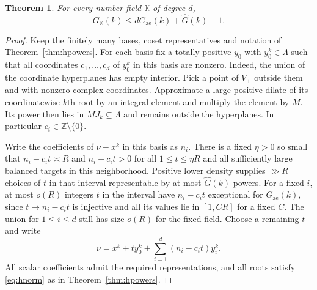 \documentclass[11pt,letterpaper]{article}
\newtheorem{theorem}{Theorem}[section]
\theoremstyle{definition}
\numberwithin{equation}{section}
\begin{document}
\begin{theorem}\label{thm:haetransfer}
For every number field $\mathbb K$ of degree $d$,
\[
               G_{\mathbb K}(k)
                   \le dG_{\mathrm{ae}}(k)+\widehat G(k)+1 .
\]
\end{theorem}
\begin{proof}
Keep the finitely many bases, coset representatives and notation of
Theorem~\ref{thm:hpowers}. For each basis fix a totally positive $y_0$
with $y_0^k\in\Lambda$ such that all coordinates $c_1,\ldots,c_d$ of
$y_0^k$ in this basis are nonzero. Indeed, the union of the coordinate
hyperplanes has empty interior. Pick a point of $V_+$ outside them
and with nonzero complex coordinates. Approximate a large positive
dilate of its coordinatewise $k$th root by an integral element and
multiply the element by $M$. Its power then lies in $MJ_k\subseteq
\Lambda$ and remains outside the hyperplanes. In particular
$c_i\in\mathbb Z\setminus\{0\}$.

Write the coefficients of $\nu-x^k$ in this basis as $n_i$.
There is a fixed $\eta>0$ so small that
$n_i-c_it\asymp R$ and $n_i-c_it>0$ for all $1\le t\le\eta R$
and all sufficiently large balanced targets in this neighborhood.
Positive lower density supplies $\gg R$ choices of $t$ in that
interval representable by at most $\widehat G(k)$ powers. For a fixed
$i$, at most $o(R)$ integers $t$ in the interval have $n_i-c_it$
exceptional for $G_{\mathrm{ae}}(k)$, since $t\mapsto n_i-c_it$ is
injective and all its values lie in $[1,CR]$ for a fixed $C$.
The union for $1\le i\le d$ still has size $o(R)$ for the fixed field.
Choose a remaining $t$ and write
\[
            \nu=x^k+t y_0^k+\sum_{i=1}^d (n_i-c_it)y_i^k .
\]
All scalar coefficients admit the required representations, and all
roots satisfy \eqref{eq:hnorm} as in Theorem~\ref{thm:hpowers}.
\end{proof}
\end{document}
